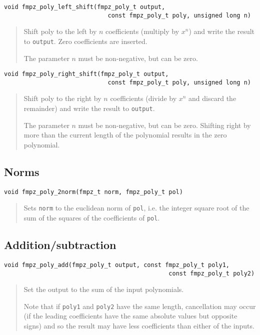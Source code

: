 \documentclass[a4paper,10pt]{article}
\newcommand{\code}{\lstinline}
\begin{document}
\begin{lstlisting}
void fmpz_poly_left_shift(fmpz_poly_t output, 
                             const fmpz_poly_t poly, unsigned long n) 
\end{lstlisting}
\begin{quote}
Shift poly to the left by $n$ coefficients (multiply by $x^n$) and write the result to \code{output}. Zero coefficients are inserted.

The parameter $n$ must be non-negative, but can be zero.
\end{quote}

\begin{lstlisting}
void fmpz_poly_right_shift(fmpz_poly_t output, 
                             const fmpz_poly_t poly, unsigned long n) 
\end{lstlisting}
\begin{quote}
Shift poly to the right by $n$ coefficients (divide by $x^n$ and discard the remainder) and write the result to \code{output}. 

The parameter $n$ must be non-negative, but can be zero. Shifting right by more than the current length of the polynomial results in the zero polynomial.
\end{quote}


\subsection{Norms}

\begin{lstlisting}
void fmpz_poly_2norm(fmpz_t norm, fmpz_poly_t pol)\end{lstlisting}
\begin{quote}
Sets \code{norm} to the euclidean norm of \code{pol}, i.e. the integer square root of the sum of the squares of the coefficients of \code{pol}.
\end{quote}


\subsection{Addition/subtraction}


\begin{lstlisting}
void fmpz_poly_add(fmpz_poly_t output, const fmpz_poly_t poly1, 
                                              const fmpz_poly_t poly2) 
\end{lstlisting}
\begin{quote}
Set the output to the sum of the input polynomials. 

Note that if \code{poly1} and \code{poly2} have the same length, cancellation may occur (if the leading coefficients have the same absolute values but opposite signs) and so the result may have less coefficients than either of the inputs. 
\end{quote}
\end{document}

